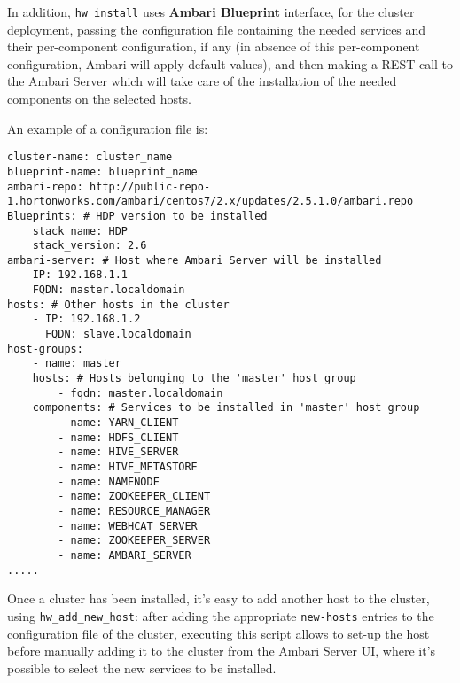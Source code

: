 In addition, \texttt{hw\_install} uses \textbf{Ambari Blueprint} interface, for the cluster deployment, passing the configuration file containing the needed services and their per-component configuration, if any (in absence of this per-component configuration, Ambari will apply default values), and then making a REST call to the Ambari Server which will take care of the installation of the needed components on the selected hosts.

\pagebreak
An example of a configuration file is:
\\

\begin{verbatim}
cluster-name: cluster_name
blueprint-name: blueprint_name
ambari-repo: http://public-repo-1.hortonworks.com/ambari/centos7/2.x/updates/2.5.1.0/ambari.repo
Blueprints: # HDP version to be installed
    stack_name: HDP
    stack_version: 2.6
ambari-server: # Host where Ambari Server will be installed
    IP: 192.168.1.1
    FQDN: master.localdomain
hosts: # Other hosts in the cluster
    - IP: 192.168.1.2
      FQDN: slave.localdomain
host-groups:
    - name: master
    hosts: # Hosts belonging to the 'master' host group
        - fqdn: master.localdomain
    components: # Services to be installed in 'master' host group
        - name: YARN_CLIENT
        - name: HDFS_CLIENT
        - name: HIVE_SERVER
        - name: HIVE_METASTORE
        - name: NAMENODE
        - name: ZOOKEEPER_CLIENT
        - name: RESOURCE_MANAGER
        - name: WEBHCAT_SERVER
        - name: ZOOKEEPER_SERVER
        - name: AMBARI_SERVER
.....
\end{verbatim}
\pagebreak

Once a cluster has been installed, it's easy to add another host to the cluster, using \texttt{hw\_add\_new\_host}: after adding the appropriate \texttt{new-hosts} entries to the configuration file of the cluster, executing this script allows to set-up the host before manually adding it to the cluster from the Ambari Server UI, where it's possible to select the new services to be installed.
